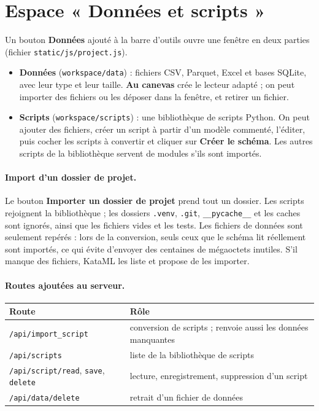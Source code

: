 \documentclass[11pt,a4paper]{article}
\newcommand{\code}[1]{\texttt{#1}}
\newcommand{\ui}[1]{\textsf{\textbf{#1}}}   %
\begin{document}
\section{Espace « Données et scripts »}

Un bouton \ui{Données} ajouté à la barre d'outils ouvre une fenêtre en deux parties
(fichier \code{static/js/project.js}).

\begin{itemize}
  \item \textbf{Données} (\code{workspace/data}) : fichiers CSV, Parquet, Excel et
        bases SQLite, avec leur type et leur taille. \ui{Au canevas} crée le lecteur
        adapté ; on peut importer des fichiers ou les déposer dans la fenêtre, et
        retirer un fichier.
  \item \textbf{Scripts} (\code{workspace/scripts}) : une bibliothèque de scripts
        Python. On peut ajouter des fichiers, créer un script à partir d'un modèle
        commenté, l'éditer, puis cocher les scripts à convertir et cliquer sur
        \ui{Créer le schéma}. Les autres scripts de la bibliothèque servent de
        modules s'ils sont importés.
\end{itemize}

\paragraph{Import d'un dossier de projet.} Le bouton \ui{Importer un dossier de
projet} prend tout un dossier. Les scripts rejoignent la bibliothèque ; les dossiers
\code{.venv}, \code{.git}, \code{\_\_pycache\_\_} et les caches sont ignorés, ainsi que les
fichiers vides et les tests. Les fichiers de données sont seulement repérés : lors de
la conversion, seuls ceux que le schéma lit réellement sont importés, ce qui évite
d'envoyer des centaines de mégaoctets inutiles. S'il manque des fichiers, KataML les
liste et propose de les importer.

\paragraph{Routes ajoutées au serveur.}
\begin{center}
\begin{tabularx}{\linewidth}{>{\raggedright\arraybackslash}p{6.2cm}X}
  \toprule
  \textbf{Route} & \textbf{Rôle} \\
  \midrule
  \code{/api/import\_script} & conversion de scripts ; renvoie aussi les données manquantes \\
  \code{/api/scripts} & liste de la bibliothèque de scripts \\
  \code{/api/script/read}, \code{save}, \code{delete} & lecture, enregistrement, suppression d'un script \\
  \code{/api/data/delete} & retrait d'un fichier de données \\
  \bottomrule
\end{tabularx}
\end{center}
\end{document}
